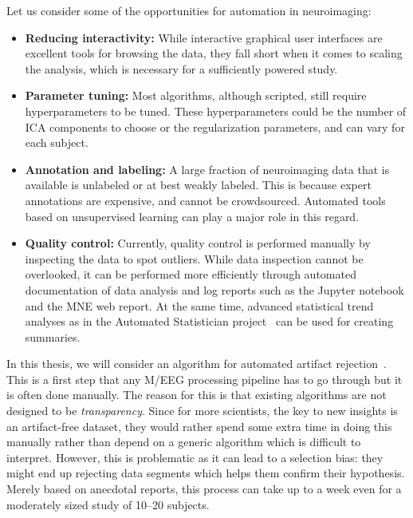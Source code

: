 Let us consider some of the opportunities for automation in neuroimaging:
\begin{itemize}[noitemsep,nolistsep,nosep]
\item \textbf{Reducing interactivity:} While interactive graphical user interfaces are excellent tools for browsing the data, they fall short when it comes to scaling the analysis, which is necessary for a sufficiently powered study. 

\item \textbf{Parameter tuning:} Most algorithms, although scripted, still require hyperparameters to be tuned. These hyperparameters could be the number of ICA components to choose or the regularization parameters, and can vary for each subject.
\item \textbf{Annotation and labeling:} A large fraction of neuroimaging data that is available is unlabeled or at best weakly labeled. This is because expert annotations are expensive, and cannot be crowdsourced. Automated tools based on unsupervised learning can play a major role in this regard.
\item \textbf{Quality control:} Currently, quality control is performed manually by inspecting the data to spot outliers. While data inspection cannot be overlooked, it can be performed more efficiently through automated documentation of data analysis and log reports such as the Jupyter notebook and the MNE web report. At the same time, advanced statistical trend analyses as in the Automated Statistician project~\citep{duvenaud2013structure} can be used for creating summaries.
\end{itemize}
In this thesis, we will consider an algorithm for automated artifact rejection~\citep{jas2016automated, jas2017autoreject}. This is a first step that any M/EEG processing pipeline has to go through but it is often done manually. The reason for this is that existing algorithms are not designed to be \emph{transparency}. Since for more scientists, the key to new insights is an artifact-free dataset, they would rather spend some extra time in doing this manually rather than depend on a generic algorithm which is difficult to interpret. However, this is problematic as it can lead to a selection bias: they might end up rejecting data segments which helps them confirm their hypothesis. Merely based on anecdotal reports, this process can take up to a week even for a moderately sized study of 10--20 subjects.


